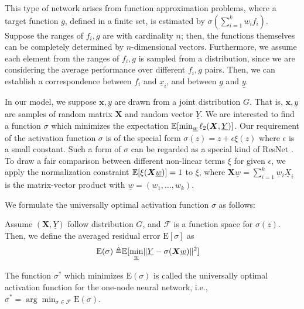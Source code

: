 \documentclass[appliedmath,article,accept,pdftex,moreauthors]{Definitions/mdpi}
\begin{document}
This type of network arises from function approximation problems, where a target function $g$, defined in a finite set,
is estimated by $\sigma(\sum_{i=1}^k w_i f_i)$. %
Suppose the ranges of $f_i, g$ are with cardinality $n$; 
then, the functions themselves can be completely determined by $n$-dimensional vectors.
Furthermore, we assume each element from the ranges of $f_i, g$ is sampled from a distribution,
since we are considering the average performance over different $f_i, g$ pairs.
Then, we can establish a correspondence between
$f_i$ and $\underline{x}_i$,
and between $g$ and $\underline{y}$.


In our model, we suppose $\bm{x},\underline{y}$ are drawn from
a joint distribution $G$.
That is, $\bm{x},\underline{y}$ are samples of random matrix $\bm{X}$ and random vector $\underline{Y}$.
We are interested to find a function $\sigma$ which minimizes
the expectation $\mathbb{E}[ \min_{\underline{w}} \ell_2(\bm{X},\underline{Y})]$.
Our requirement of the activation function $\sigma$ is of the special form
$\sigma(z) = z + \epsilon \xi(z)$ where
$\epsilon$ is a small constant. Such a form of $\sigma$
can be regarded as a special kind of ResNet \cite{resnet16}.
To draw a fair comparison between different
non-linear terms $\xi$ for given $\epsilon$, we apply the normalization constraint
$\mathbb{E}[\xi(\bm{X}\underline{w})]=1$ to $\xi$, where
$\bm{X}\underline{w} = \sum_{i=1}^k w_i \underline{X}_i$ is the matrix-vector product with  $\underline{w}=(w_1, \dots, w_k)$.

We formulate the universally optimal activation function $\sigma$ as follows:
\begin{Definition}\label{def:ug}
Assume $(\bm{X}, \underline{Y})$ follow distribution $G$, and
$\mathcal{F}$ is a function space for $\sigma(z)$. Then, 
we define the averaged residual error $\mathrm{E}[\sigma]$ as
\begin{align}\label{eq:ug}
\mathrm{E}(\sigma) \triangleq & \mathbb{E}[ \min_{\underline{w}} \lVert\underline{Y} - \sigma(\bm{X} \underline{w})\rVert^2] 
\end{align}

{The} function $\sigma^*$ which minimizes $\mathrm{E}(\sigma)$
is called the universally optimal activation function for the one-node neural network,
i.e., $\sigma^* = \arg\min_{\sigma \in \mathcal{F}} \mathrm{E}(\sigma)$.
\end{Definition}
\end{document}
